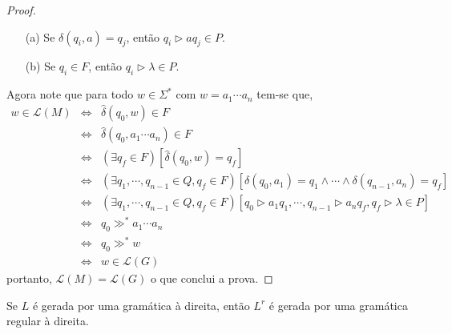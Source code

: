 \begin{proof}
	\begin{itemize}
		\item[(a)] Se $\delta(q_i, a) = q_j$, então $q_i \rhd aq_j \in P$.
		\item[(b)] Se $q_i \in F$, então $q_i \rhd \lambda \in P$.
	\end{itemize} 
	Agora note que para todo $w \in \Sigma^*$ com $w = a_1 \cdots a_n$ tem-se que, 
	\begin{eqnarray*}
		w \in \mathcal{L}(M) & \Longleftrightarrow & \widehat{\delta}(q_0, w) \in F\\
		& \Longleftrightarrow & \widehat{\delta}(q_0, a_1 \cdots a_n) \in F\\
		& \Longleftrightarrow & (\exists q_f \in F)[\widehat{\delta}(q_0, w) = q_f]\\
		& \Longleftrightarrow & (\exists q_1, \cdots, q_{n-1} \in Q,  q_f \in F)[\delta(q_0, a_1) = q_1 \land \cdots \land \delta(q_{n-1}, a_n) = q_f]\\
		& \Longleftrightarrow & (\exists q_1, \cdots, q_{n-1} \in Q,  q_f \in F)[q_0 \rhd a_1q_1, \cdots, q_{n-1} \rhd a_nq_f, q_f \rhd \lambda \in P]\\
		& \Longleftrightarrow & q_0 \gg^* a_1 \cdots a_n\\
		& \Longleftrightarrow & q_0 \gg^* w\\
		& \Longleftrightarrow & w \in \mathcal{L}(G)
	\end{eqnarray*} 
	portanto, $\mathcal{L}(M) = \mathcal{L}(G)$ o que conclui a prova.
\end{proof}

\begin{lemma}\label{lema:GRD-Reversa}
	Se $L$ é gerada por uma gramática à direita, então $L^r$ é gerada por uma gramática regular à direita.
\end{lemma}

